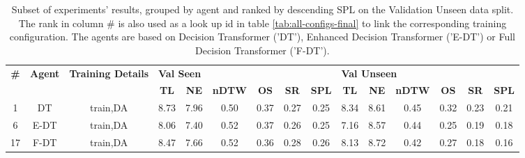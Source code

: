 \begin{table}
\centering
\caption{\label{tab:dagger}Subset of experiments' results, grouped by agent and ranked by descending SPL on the Validation Unseen data split. The rank in column \# is also used as a look up id in table \ref{tab:all-configs-final} to link the corresponding training configuration.     \newline The agents are based on Decision Transformer ('DT'), Enhanced Decision Transformer ('E-DT') or Full Decision Transformer ('F-DT').}
\begin{tabular}{@{\hskip3pt}c@{\hskip3pt}c@{\hskip3pt}c@{\hskip3pt}c@{\hskip3pt}c@{\hskip3pt}c@{\hskip3pt}c@{\hskip3pt}c@{\hskip3pt}c@{\hskip3pt}c@{\hskip3pt}c@{\hskip3pt}c@{\hskip3pt}c@{\hskip3pt}c@{\hskip3pt}c}
\toprule
\textbf{\#} & \textbf{Agent} & \textbf{Training Details} & \multicolumn{6}{l}{\textbf{Val Seen}} & \multicolumn{6}{l}{\textbf{Val Unseen}} \\
 \textbf{~} &     \textbf{~} &                \textbf{~} &       \textbf{TL} & \textbf{NE} & \textbf{nDTW} & \textbf{OS} & \textbf{SR} & \textbf{SPL} &         \textbf{TL} & \textbf{NE} & \textbf{nDTW} & \textbf{OS} & \textbf{SR} & \textbf{SPL} \\
\midrule
          1 &             DT &                  train,DA &              8.73 &        7.96 &          0.50 &        0.37 &        0.27 &         0.25 &                8.34 &        8.61 &          0.45 &        0.32 &        0.23 &         0.21 \\
          6 &           E-DT &                  train,DA &              8.06 &        7.40 &          0.52 &        0.37 &        0.26 &         0.25 &                7.16 &        8.57 &          0.44 &        0.25 &        0.19 &         0.18 \\
         17 &           F-DT &                  train,DA &              8.47 &        7.66 &          0.52 &        0.36 &        0.28 &         0.26 &                8.13 &        8.72 &          0.42 &        0.27 &        0.18 &         0.16 \\
\bottomrule
\end{tabular}
\end{table}
